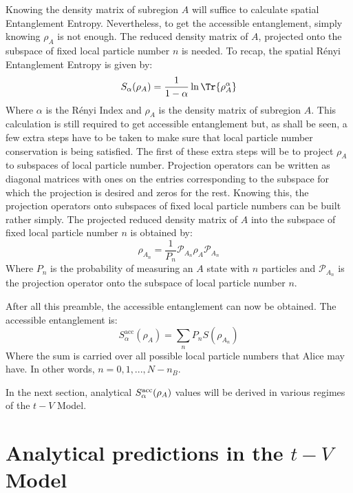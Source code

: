 	Knowing the density matrix of subregion $A$ will suffice to calculate spatial Entanglement Entropy. Nevertheless, to get the accessible entanglement, simply knowing $\rho_{A}$ is not enough. The reduced density matrix of $A$, projected onto the subspace of fixed local particle number $n$ is needed. To recap, the spatial R\'enyi Entanglement Entropy is given by:
%	
\begin{equation}
 S_{\alpha}(\rho_{A}) = \frac{1}{1-\alpha} \ln{\Tr{\rho_{A}^{\alpha}}} 
\end{equation}
%
Where $\alpha$ is the R\'enyi Index and $\rho_{A}$ is the density matrix of subregion $A$. This calculation is still required to get accessible entanglement but, as shall be seen, a few extra steps have to be taken to make sure that local particle number conservation is being satisfied. The first of these extra steps will be to project $\rho_{A}$ to subspaces of local particle number. Projection operators can be written as diagonal matrices with ones on the entries corresponding to the subspace for which the projection is desired and zeros for the rest. Knowing this, the projection operators onto subspaces of fixed local particle numbers can be built rather simply. The projected reduced density matrix of  $A$ into the subspace of fixed local particle number $n$ is obtained by:
%
\begin{equation}
\rho_{A_n} = \frac{1}{P_n} \mathcal{P}_{A_n} \rho_A \mathcal{P}_{A_n}
\label{eq:accessibleEE}
\end{equation}
%
Where $P_n$ is the probability of measuring an $A$ state with $n$ particles and $\mathcal{P}_{A_n}$ is the projection operator onto the subspace of local particle number $n$.

After all this preamble, the accessible entanglement can now be obtained. The accessible entanglement is:
%
\begin{equation}
S_{\alpha}^{\mathrm{acc}}(\rho_A) = \sum_{n} P_n S(\rho_{A_n}) 
\label{eq:accessibleEE}
\end{equation}
%
Where the sum is carried over all possible local particle numbers that Alice may have. In other words, $n=0,1,...,N-n_{B}$.

In the next section, analytical $S_{\alpha}^{\rm acc}(\rho_A)$ values will be derived in various regimes of the $t-V$ Model.

\section{Analytical predictions in the $t-V$ Model}

